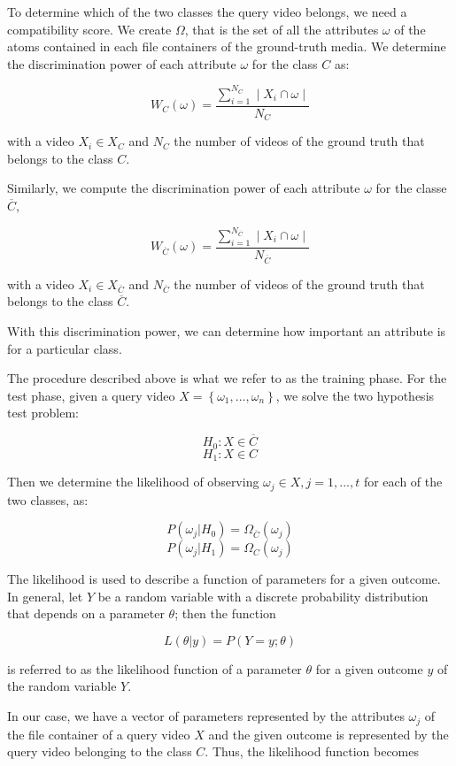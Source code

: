 To determine which of the two classes the query video belongs, we need a compatibility score. We create $\Omega$, that is the set of all the attributes $\omega$ of the atoms contained in each file containers of the ground-truth media. We determine the discrimination power of each attribute $\omega$ for the class $C$ as:

$$  W_{C}(\omega) = \dfrac{\sum\limits_{i=1}^{N_{C}}\mid X_{i} \cap \omega \mid}{N_{C}} $$

with a video $X_{i} \in X_{C}$ and $N_{C}$ the number of videos of the ground truth that belongs to the class $C$.

Similarly, we compute the discrimination power of each attribute $\omega$ for the classe $\overline{C}$,

$$  W_{\overline{C}}(\omega) = \dfrac{\sum\limits_{i=1}^{N_{\overline{C}}}\mid X_{i} \cap \omega \mid}{N_{\overline{C}}} $$

with a video $X_{i} \in X_{\overline{C}}$ and $N_{\overline{C}}$ the number of videos of the ground truth that belongs to the class $\overline{C}$.

With this discrimination power, we can determine how important an attribute is for a particular class.

The procedure described above is what we refer to as the training phase. For the test phase, given a query video $X = \left\lbrace \omega_{1},...,\omega_{n} \right\rbrace  $, we solve the two hypothesis test problem:

$$  H_{0}:X \in \overline{C} $$
$$  H_{1}:X \in C $$

Then we determine the likelihood of observing $\omega_{j} \in X, j = 1,...,t$ for each of the two classes, as:

$$ P(\omega_{j}\vert H_{0}) = \Omega_{\overline{C}}(\omega_{j}) $$
$$ P(\omega_{j}\vert H_{1}) = \Omega_{C}(\omega_{j}) $$ 

The likelihood is used to describe a function of parameters for a given outcome. In general, let $Y$ be a random variable with a discrete probability distribution that depends on a parameter $\theta$; then the function

$$ L(\theta | y) = P(Y = y; \theta) $$

is referred to as the likelihood function of a parameter $\theta$ for a given outcome $y$ of the random variable $Y$.

In our case, we have a vector of parameters represented by the attributes $\omega_{j}$ of the file container of a query video $X$ and the given outcome is represented by the query video belonging to the class $C$. Thus, the likelihood function becomes

